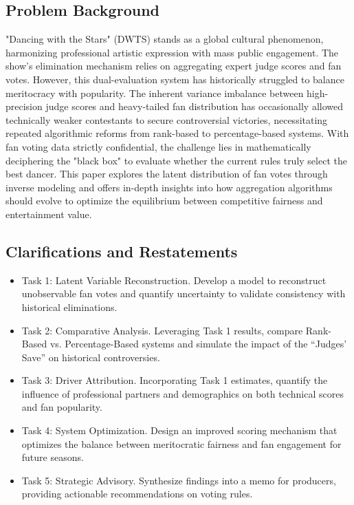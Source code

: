 \documentclass{mcmthesis}
\begin{document}
\subsection{Problem Background} 
"Dancing with the Stars" (DWTS) stands as a global cultural phenomenon, harmonizing professional artistic expression with mass public engagement. The show’s elimination mechanism relies on aggregating expert judge scores and fan votes. However, this dual-evaluation system has historically struggled to balance meritocracy with popularity. The inherent variance imbalance between high-precision judge scores and heavy-tailed fan distribution has occasionally allowed technically weaker contestants to secure controversial victories, necessitating repeated algorithmic reforms from rank-based to percentage-based systems. With fan voting data strictly confidential, the challenge lies in mathematically deciphering the "black box" to evaluate whether the current rules truly select the best dancer. This paper explores the latent distribution of fan votes through inverse modeling and offers in-depth insights into how aggregation algorithms should evolve to optimize the equilibrium between competitive fairness and entertainment value.

\subsection{Clarifications and Restatements}
\begin{itemize}
\setlength{\itemsep}{0pt}   %
\setlength{\parskip}{0pt}   %
\setlength{\parsep}{0pt}    %

\item Task 1: Latent Variable Reconstruction. Develop a model to reconstruct unobservable fan votes and quantify uncertainty to validate consistency with historical eliminations.

\item Task 2: Comparative Analysis. Leveraging Task 1 results, compare Rank-Based vs. Percentage-Based systems and simulate the impact of the ``Judges' Save'' on historical controversies.

\item Task 3: Driver Attribution. Incorporating Task 1 estimates, quantify the influence of professional partners and demographics on both technical scores and fan popularity.

\item Task 4: System Optimization. Design an improved scoring mechanism that optimizes the balance between meritocratic fairness and fan engagement for future seasons.

\item Task 5: Strategic Advisory. Synthesize findings into a memo for producers, providing actionable recommendations on voting rules.
\end{itemize}
\vspace{-0.6em}
\end{document}
